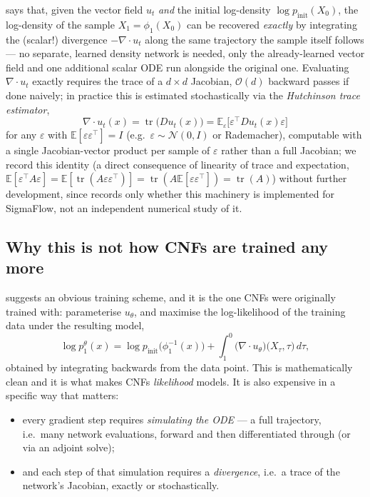 \documentclass[11pt,a4paper]{report}
\theoremstyle{definition}
\theoremstyle{remark}
\DeclareMathOperator{\tr}{tr}
\newcommand{\EE}{\mathbb E}
\begin{document}
 says that, given the vector field $u_t$
\emph{and} the initial log-density $\log p_{\mathrm{init}}(X_0)$, the
log-density of the sample $X_1=\phi_1(X_0)$ can be recovered \emph{exactly}
by integrating the (scalar!) divergence $-\nabla\cdot u_t$ along the same
trajectory the sample itself follows --- no separate, learned density
network is needed, only the already-learned vector field and one
additional scalar ODE run alongside the original one. Evaluating
$\nabla\cdot u_t$ exactly requires the trace of a $d\times d$ Jacobian,
$\mathcal O(d)$ backward passes if done naively; in practice this is
estimated stochastically via the \emph{Hutchinson trace estimator},
\[
\nabla\cdot u_t(x) = \tr\bigl(Du_t(x)\bigr) = \EE_{\varepsilon}\bigl[\varepsilon^\top Du_t(x)\varepsilon\bigr]
\]
for any $\varepsilon$ with $\EE[\varepsilon\varepsilon^\top]=I$ (e.g.\
$\varepsilon\sim\mathcal N(0,I)$ or Rademacher), computable with a single
Jacobian-vector product per sample of $\varepsilon$ rather than a full
Jacobian; we record this identity (a direct consequence of linearity of
trace and expectation, $\EE[\varepsilon^\top A\varepsilon]=\EE[\tr(A\varepsilon\varepsilon^\top)]=\tr(A\EE[\varepsilon\varepsilon^\top])=\tr(A)$)
without further development, since \Cref{sec:likelihood-confidence}
records only whether this machinery is implemented for SigmaFlow, not an
independent numerical study of it.

\subsection{Why this is not how CNFs are trained any more}
\label{sec:cnf-mle}

 suggests an obvious training scheme, and it is
the one CNFs were originally trained with: parameterise $u_\theta$, and
maximise the log-likelihood of the training data under the resulting model,
\[
\log p_1^\theta(x)
=
\log p_{\mathrm{init}}\bigl(\phi_1^{-1}(x)\bigr)
+
\int_1^0\!\!\bigl(\nabla\cdot u_\theta\bigr)\bigl(X_\tau,\tau\bigr)\,d\tau ,
\]
obtained by integrating  backwards from the data
point. This is mathematically clean and it is what makes CNFs
\emph{likelihood} models. It is also expensive in a specific way that
matters:

\begin{itemize}
\item every gradient step requires \emph{simulating the ODE} --- a full
      trajectory, i.e.\ many network evaluations, forward and then
      differentiated through (or via an adjoint solve);
\item and each step of that simulation requires a \emph{divergence},
      i.e.\ a trace of the network's Jacobian, exactly or stochastically.
\end{itemize}
\end{document}
